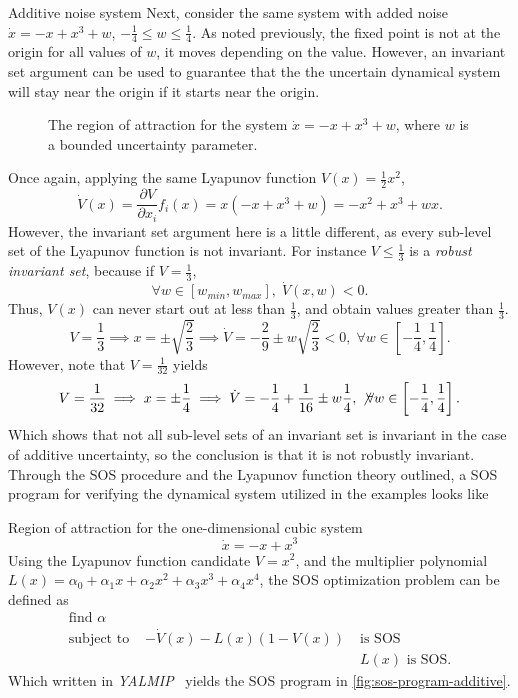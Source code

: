 \begin{example}{Additive noise system}
  Next, consider the same system with added noise \(\dot{x} = -x + x^3 + w\),
  \(-\frac{1}{4} \leq w \leq \frac{1}{4}\). As noted previously, the fixed point
  is not at the origin for all values of \(w\), it moves depending on the value.
  However, an invariant set argument can be used to guarantee that the the
  uncertain dynamical system will stay near the origin if it starts near the
  origin.
\end{example}

\begin{figure}
  \centering
  
  \caption[The region of attraction for the system \(\dot{x} = -x + x^3 + w\)]{The region of attraction for the system \(\dot{x} = -x + x^3 + w\),
    where \(w\) is a bounded uncertainty parameter.}
\end{figure}

Once again, applying the same Lyapunov function \(V(x) = \frac{1}{2}x^2\),
\[
  \dot{V}(x) = \frac{\partial V}{\partial x_i} f_i(x) = x(-x + x^3 + w) = -x^2 +
  x^3 + wx.
\]
However, the invariant set argument here is a little different, as every
sub-level set of the Lyapunov function is not invariant. For instance \(V \leq
\frac{1}{3}\) is a \textit{robust invariant set}, because if \(V =
\frac{1}{3}\),
\[
  \forall w \in \left[ w_{min}, w_{max} \right], \; \dot{V}(x,w) < 0.
\]
Thus, \(V(x)\) can never start out at less than \(\frac{1}{3}\), and obtain
values greater than \(\frac{1}{3}\).
\[
  V = \frac{1}{3} \implies x = \pm \sqrt{\frac{2}{3}} \implies \dot{V} =
  -\frac{2}{9} \pm w \sqrt{\frac{2}{3}} < 0, \; \forall w \in \left[
    -\frac{1}{4}, \frac{1}{4} \right].
\]
However, note that \(V = \frac{1}{32}\) yields
\[
  V = \frac{1}{32} \implies x = \pm \frac{1}{4} \implies \dot{V} = -\frac{1}{4}
  + \frac{1}{16} \pm w\frac{1}{4}, \; \not \forall w \in \left[ -\frac{1}{4},
    \frac{1}{4} \right].
\]
Which shows that not all sub-level sets of an invariant set is invariant in the
case of additive uncertainty, so the conclusion is that it is not robustly
invariant. Through the \ac{SOS} procedure and the Lyapunov function theory
outlined, a \ac{SOS} program for verifying the dynamical system utilized in the
examples looks like

\begin{example}{Region of attraction for the one-dimensional cubic system}
  \[
    \dot{x} = -x + x^3
  \]
  Using the Lyapunov function candidate \(V = x^2\), and the multiplier
  polynomial \(L(x) = \alpha_0 + \alpha_1x + \alpha_2x^2 + \alpha_3x^3 +
  \alpha_4x^4\), the \ac{SOS} optimization problem can be defined as
  \begin{align*}
    \text{find } \alpha& \\
    \text{subject to }& -\dot{V}(x) - L(x)\left( 1 - V(x) \right) \; &\text{is SOS} \\
                       & &L(x) \text{ is SOS}.
  \end{align*}
  Which written in \textit{YALMIP}~\cite{Lofberg2004,Lofberg2009} yields the
  \ac{SOS} program in \cref{fig:sos-program-additive}.
\end{example}

